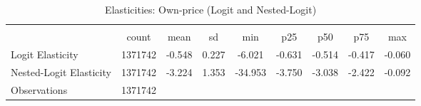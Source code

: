 \begin{table}[htbp]\centering
\def\sym#1{\ifmmode^{#1}\else\(^{#1}\)\fi}
\caption{Elasticities: Own-price (Logit and Nested-Logit)}
\begin{tabular}{l*{1}{cccccccc}}
\toprule
                    &\multicolumn{8}{c}{}                                                                                   \\
                    &       count&        mean&          sd&         min&         p25&         p50&         p75&         max\\
\midrule
Logit Elasticity    &     1371742&      -0.548&       0.227&      -6.021&      -0.631&      -0.514&      -0.417&      -0.060\\
Nested-Logit Elasticity&     1371742&      -3.224&       1.353&     -34.953&      -3.750&      -3.038&      -2.422&      -0.092\\
\midrule
Observations        &     1371742&            &            &            &            &            &            &            \\
\bottomrule
\end{tabular}
\end{table}
